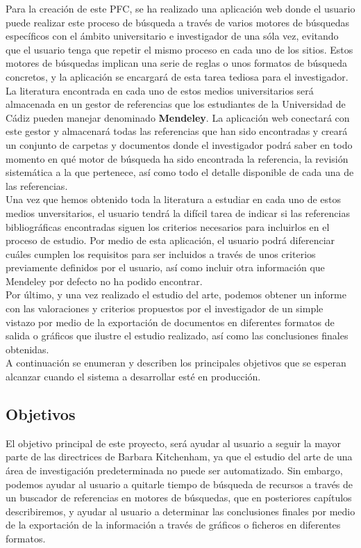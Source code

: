 Para la creación de este PFC, se ha realizado una aplicación web donde el usuario puede realizar este proceso de búsqueda a través de varios motores de búsquedas específicos con el ámbito universitario e investigador de una sóla vez, evitando que el usuario tenga que repetir el mismo proceso en cada uno de los sitios. Estos motores de búsquedas implican una serie de reglas o unos formatos de búsqueda concretos, y la aplicación se encargará de esta tarea tediosa para el investigador.\\

La literatura encontrada en cada uno de estos medios universitarios será almacenada en un gestor de referencias que los estudiantes de la Universidad de Cádiz pueden manejar denominado \textbf{Mendeley}.
La aplicación web conectará con este gestor y almacenará todas las referencias que han sido encontradas y creará un conjunto de carpetas y documentos donde el investigador podrá saber en todo momento en qué motor de búsqueda ha sido encontrada la referencia, la revisión sistemática a la que pertenece, así como todo el detalle disponible de cada una de las referencias.\\

Una vez que hemos obtenido toda la literatura a estudiar en cada uno de estos medios unversitarios, el usuario tendrá la difícil tarea de indicar si las referencias bibliográficas encontradas siguen los criterios necesarios para incluirlos en el proceso de estudio. Por medio de esta aplicación, el usuario podrá diferenciar cuáles cumplen los requisitos para ser incluidos a través de unos criterios previamente definidos por el usuario, así como incluir otra información que Mendeley por defecto no ha podido encontrar.\\

Por último, y una vez realizado el estudio del arte, podemos obtener un informe con las valoraciones y criterios propuestos por el investigador de un simple vistazo por medio de la exportación de documentos en diferentes formatos de salida o gráficos que ilustre el estudio realizado, así como las conclusiones finales obtenidas.\\

A continuación se enumeran y describen los principales objetivos que se esperan alcanzar cuando el sistema a desarrollar esté en producción.

\subsection{Objetivos}
El objetivo principal de este proyecto, será ayudar al usuario a seguir la mayor parte de las directrices de Barbara Kitchenham, ya que el estudio del arte de una área de investigación predeterminada no puede ser automatizado. Sin embargo, podemos ayudar al usuario a quitarle tiempo de búsqueda de recursos a través de un buscador de referencias en motores de búsquedas, que en posteriores capítulos describiremos, y ayudar al usuario a determinar las conclusiones finales por medio de la exportación de la información a través de gráficos o ficheros en diferentes formatos.\\

